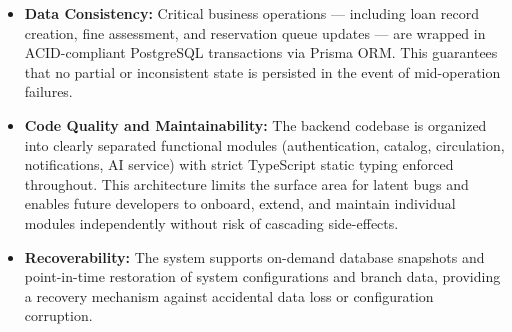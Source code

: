 \begin{itemize}

    \item \textbf{Data Consistency:} Critical business operations --- including loan record creation, fine assessment, and reservation queue updates --- are wrapped in ACID-compliant PostgreSQL transactions via Prisma ORM. This guarantees that no partial or inconsistent state is persisted in the event of mid-operation failures.



    \item \textbf{Code Quality and Maintainability:} The backend codebase is organized into clearly separated functional modules (authentication, catalog, circulation, notifications, AI service) with strict TypeScript static typing enforced throughout. This architecture limits the surface area for latent bugs and enables future developers to onboard, extend, and maintain individual modules independently without risk of cascading side-effects.



    \item \textbf{Recoverability:} The system supports on-demand database snapshots and point-in-time restoration of system configurations and branch data, providing a recovery mechanism against accidental data loss or configuration corruption.

\end{itemize}





